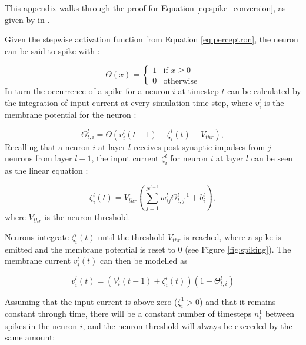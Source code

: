This appendix walks through the proof for Equation \ref{eq:spike_conversion},
as given by \citeauthor{Rueckauer2017} in \cite{Rueckauer2017}.

Given the stepwise activation function from Equation \ref{eq:perceptron},
the neuron can be said to spike with \cite[p. 3]{Diehl2015, Rueckauer2017}:

\begin{equation}
\Theta(x) = \begin{cases}
  	1 & \text{if } x \geq 0 \\
	0 & \text{otherwise}
	\end{cases}
\label{eq:spike_theta}
\end{equation}
\noindent
In turn the occurrence of a spike for a neuron $i$ at timestep $t$ can be
calculated by the integration of input current at every simulation time step, where
$v_i^l$ is the membrane potential for the neuron \cite[p. 3]{Rueckauer2017}:

\begin{equation}
\Theta^l_{t,i} = \Theta(v^l_i (t-1) + \zeta^l_i(t) - V_{thr}),
\label{eq:current_timestep}
\end{equation}
\noindent
Recalling that a neuron $i$ at layer $l$ receives post-synaptic
impulses from $j$ neurons from layer $l - 1$, the input current $\zeta^l_i$ for neuron $i$
at layer $l$ can be seen as the linear equation
\cite[p. 3]{Rueckauer2017}:

\begin{equation}
\zeta^l_i (t) = V_{thr}\left(\sum^{N^{l - 1}}_{j = 1} w^l_{ij} \Theta^{l - 1}_{t,j} + b^l_i\right) ,
\label{eq:membrane_timestep}
\end{equation}
\noindent
where $V_{thr}$ is the neuron threshold. 

Neurons integrate $\zeta_i^l(t)$ until the threshold $V_{thr}$ is 
reached, where a spike is emitted and the membrane potential is reset to 
0 (see Figure \ref{fig:spiking}).
The membrane current $v_i^l(t)$ can then be modelled as

\begin{equation}
v_i^l(t) = \left(V_i^l(t - 1) + \zeta_i^l(t)\right)\left(1 - \Theta_{t,i}^l\right)
\label{eq:membrane_current_sim}
\end{equation}

\noindent
Assuming that the input current is above zero ($\zeta_i^1 > 0$) and that it
remains constant through time, there will be a constant number of timesteps $n_i^1$
between spikes in the neuron $i$, and the neuron threshold will always be exceeded
by the same amount:

